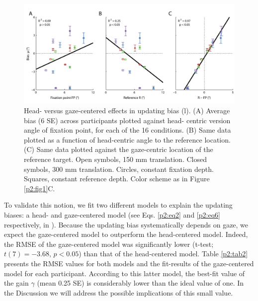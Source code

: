 \begin{figure}
    \includegraphics[width=1.0\textwidth]{src/paper2/figure4.pdf}
    
    \caption{Head- versus gaze-centered effects in updating bias (l). (A) Average bias (6 SE) across participants plotted against head- centric version angle of fixation point, for each of the 16 conditions. (B) Same data plotted as a function of head-centric angle to the reference location. (C) Same data plotted against the gaze-centric location of the reference target. Open symbols, 150 mm translation. Closed symbols, 300 mm translation. Circles, constant fixation depth. Squares, constant reference depth. Color scheme as in Figure \ref{p2:fig1}C.}
    
    \label{p2:fig4}
\end{figure}

To validate this notion, we fit two different models to explain the updating biases: a head- and gaze-centered model (see Eqs. \ref{p2:eq2} and \ref{p2:eq6} respectively, in ). Because the updating bias systematically depends on gaze, we expect the gaze-centered model to outperform the head-centered model. Indeed, the RMSE of the gaze-centered model was significantly lower (t-test; $t(7) = -3.68$, $p < 0.05$) than that of the head-centered model. Table \ref{p2:tab2} presents the RMSE values for both models and the fit-results of the gaze-centered model for each participant. According to this latter model, the best-fit value of the gain $\gamma$ (mean 0.25  SE) is considerably lower than the ideal value of one. In the Discussion we will address the possible implications of this small value.

